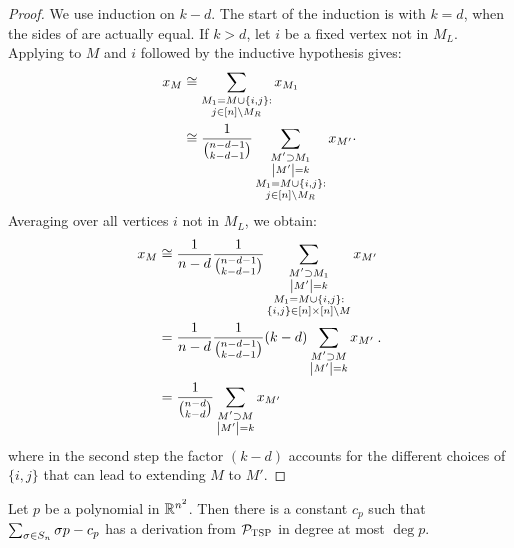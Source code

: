 \begin{proof}
We use induction on \(k - d\).
The start of the induction is with \(k = d\),
when the sides of 
are actually equal. If \(k > d\), let \(i\) be a fixed vertex not in \(M_L\).
Applying  to \(M\) and \(i\)
followed by the inductive hypothesis gives:
\begin{equation*}
	\begin{split}
    x_{M}
    &\cong
    \sum_{\substack{M_{1} = M \cup \{i,j\}: \\
        j \in [n] \setminus M_R}}
    x_{M_{1}} \\
    &\cong
    \frac{1}{\binom{n - d - 1}{k - d - 1}}
    \sum_{\substack{
        M' \supset M_{1} \\ \left|M'\right| = k \\
        M_{1} = M \cup \{i,j\}: \\
        j \in [n] \setminus M_R}}
    x_{M'}
    \end{split}
    .
\end{equation*}
Averaging over all vertices \(i\) not in $M_L$,
we obtain:
\begin{equation*}
  \begin{split}
  x_{M}
  &\cong
  \frac{1}{n - d}
  \frac{1}{\binom{n - d - 1}{k - d - 1}}
  \sum_{\substack{
      M' \supset M_{1} \\ \left|M'\right| = k \\
      M_{1} = M \cup \{i,j\}: \\
      \{i,j\} \in [n]\times[n] \setminus M}}
  x_{M'} \\
  &=
  \frac{1}{n - d}
  \frac{1}{\binom{n - d - 1}{k - d - 1}}
  (k - d)
  \sum_{\substack{
      M' \supset M \\ \left|M'\right| = k}}
  x_{M'} \\
  &=
  \frac{1}{\binom{n - d}{k - d}}
  \sum_{\substack{M' \supset M \\ \left|M'\right| = k}}
  x_{M'}
  \end{split}
  .
\end{equation*}
where in the second step the factor \((k - d)\) accounts for the different choices of $\{i,j\}$ that can lead to extending $M$ to $M'$.
\end{proof}
\begin{lemma}
  \label{lem:tsp-constant}
  Let $p$ be a polynomial in $\mathbb R^{n^2}$.
	Then there is a constant $c_p$ such that $\sum_{\sigma \in S_{n}} \sigma p - c_p$ has a derivation from $\mathcal P_{\textsc{TSP}}$ in degree at most $\deg p$. 
\end{lemma}
